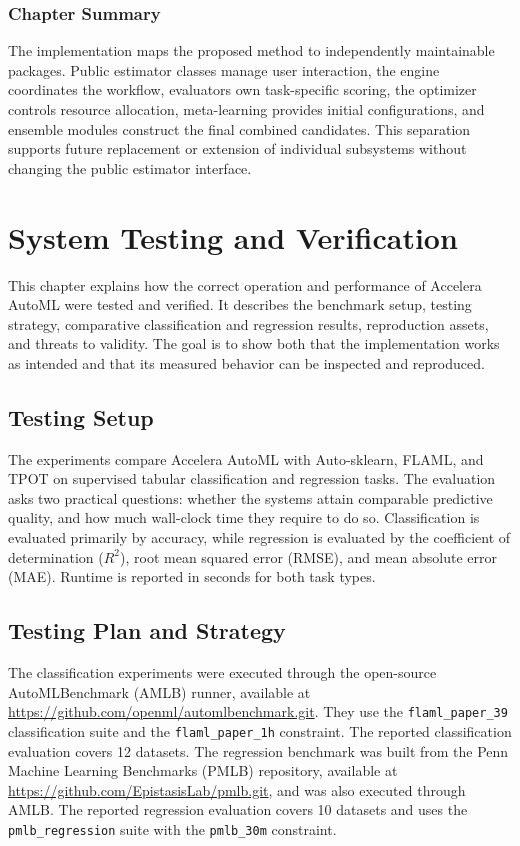 \documentclass[12pt,a4paper,oneside]{report}
\newcommand{\systemname}{Accelera AutoML}
\newcommand{\modulepath}[1]{\texttt{\footnotesize #1}}
\begin{document}
\subsection{Chapter Summary}

The implementation maps the proposed method to independently maintainable
packages. Public estimator classes manage user interaction, the engine
coordinates the workflow, evaluators own task-specific scoring, the optimizer
controls resource allocation, meta-learning provides initial configurations,
and ensemble modules construct the final combined candidates. This separation
supports future replacement or extension of individual subsystems without
changing the public estimator interface.
\fi

\chapter{System Testing and Verification}
\label{chap:testing}

This chapter explains how the correct operation and performance of
\systemname{} were tested and verified. It describes the benchmark setup,
testing strategy, comparative classification and regression results,
reproduction assets, and threats to validity. The goal is to show both that the
implementation works as intended and that its measured behavior can be
inspected and reproduced.

\section{Testing Setup}

The experiments compare \systemname{} with Auto-sklearn, FLAML, and TPOT on
supervised tabular classification and regression tasks. The evaluation asks
two practical questions: whether the systems attain comparable predictive
quality, and how much wall-clock time they require to do so. Classification is
evaluated primarily by accuracy, while regression is evaluated by the
coefficient of determination ($R^2$), root mean squared error (RMSE), and mean
absolute error (MAE). Runtime is reported in seconds for both task types.

\section{Testing Plan and Strategy}

The classification experiments were executed through the open-source
AutoMLBenchmark (AMLB) runner, available at
\url{https://github.com/openml/automlbenchmark.git}. They use the
\modulepath{flaml\_paper\_39} classification suite and the
\modulepath{flaml\_paper\_1h} constraint. The reported classification
evaluation covers 12 datasets. The regression benchmark was built from the
Penn Machine Learning Benchmarks (PMLB) repository, available at
\url{https://github.com/EpistasisLab/pmlb.git}, and was also executed through
AMLB. The reported regression evaluation covers 10 datasets and uses the
\modulepath{pmlb\_regression} suite with the \modulepath{pmlb\_30m}
constraint.
\end{document}
